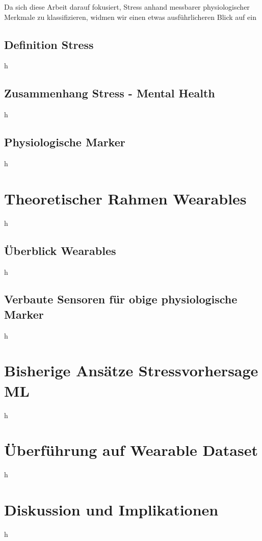 Da sich diese Arbeit darauf fokusiert, Stress anhand messbarer physiologischer Merkmale zu klassifizieren, widmen wir einen etwas ausführlicheren Blick auf ein 




\subsection{Definition Stress}
h
\subsection{Zusammenhang Stress - Mental Health}
h
\subsection{Physiologische Marker}
h
\section{Theoretischer Rahmen Wearables}
h
\subsection{Überblick Wearables}
h
\subsection{Verbaute Sensoren für obige physiologische Marker}
h
\section{Bisherige Ansätze Stressvorhersage ML}
h
\section{Überführung auf Wearable Dataset}
h
\section{Diskussion und Implikationen}
h